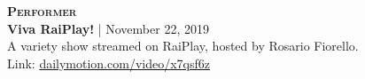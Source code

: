 \textbf{\textsc{Performer}} \\
\textbf{Viva RaiPlay!} | November 22, 2019 \\
A variety show streamed on RaiPlay, hosted by Rosario Fiorello. \\
Link: \href{https://www.dailymotion.com/video/x7qsf6z}{dailymotion.com/video/x7qsf6z}
\begin{center}
    \label{fig:vivaraiplay}	
\end{center}
